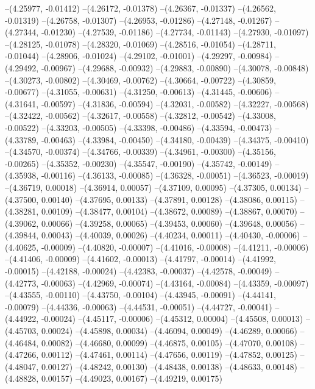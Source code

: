 --(4.25977, -0.01412)
--(4.26172, -0.01378)
--(4.26367, -0.01337)
--(4.26562, -0.01319)
--(4.26758, -0.01307)
--(4.26953, -0.01286)
--(4.27148, -0.01267)
--(4.27344, -0.01230)
--(4.27539, -0.01186)
--(4.27734, -0.01143)
--(4.27930, -0.01097)
--(4.28125, -0.01078)
--(4.28320, -0.01069)
--(4.28516, -0.01054)
--(4.28711, -0.01044)
--(4.28906, -0.01024)
--(4.29102, -0.01001)
--(4.29297, -0.00984)
--(4.29492, -0.00967)
--(4.29688, -0.00932)
--(4.29883, -0.00890)
--(4.30078, -0.00848)
--(4.30273, -0.00802)
--(4.30469, -0.00762)
--(4.30664, -0.00722)
--(4.30859, -0.00677)
--(4.31055, -0.00631)
--(4.31250, -0.00613)
--(4.31445, -0.00606)
--(4.31641, -0.00597)
--(4.31836, -0.00594)
--(4.32031, -0.00582)
--(4.32227, -0.00568)
--(4.32422, -0.00562)
--(4.32617, -0.00558)
--(4.32812, -0.00542)
--(4.33008, -0.00522)
--(4.33203, -0.00505)
--(4.33398, -0.00486)
--(4.33594, -0.00473)
--(4.33789, -0.00463)
--(4.33984, -0.00450)
--(4.34180, -0.00439)
--(4.34375, -0.00410)
--(4.34570, -0.00374)
--(4.34766, -0.00339)
--(4.34961, -0.00300)
--(4.35156, -0.00265)
--(4.35352, -0.00230)
--(4.35547, -0.00190)
--(4.35742, -0.00149)
--(4.35938, -0.00116)
--(4.36133, -0.00085)
--(4.36328, -0.00051)
--(4.36523, -0.00019)
--(4.36719, 0.00018)
--(4.36914, 0.00057)
--(4.37109, 0.00095)
--(4.37305, 0.00134)
--(4.37500, 0.00140)
--(4.37695, 0.00133)
--(4.37891, 0.00128)
--(4.38086, 0.00115)
--(4.38281, 0.00109)
--(4.38477, 0.00104)
--(4.38672, 0.00089)
--(4.38867, 0.00070)
--(4.39062, 0.00066)
--(4.39258, 0.00065)
--(4.39453, 0.00060)
--(4.39648, 0.00056)
--(4.39844, 0.00043)
--(4.40039, 0.00026)
--(4.40234, 0.00011)
--(4.40430, -0.00006)
--(4.40625, -0.00009)
--(4.40820, -0.00007)
--(4.41016, -0.00008)
--(4.41211, -0.00006)
--(4.41406, -0.00009)
--(4.41602, -0.00013)
--(4.41797, -0.00014)
--(4.41992, -0.00015)
--(4.42188, -0.00024)
--(4.42383, -0.00037)
--(4.42578, -0.00049)
--(4.42773, -0.00063)
--(4.42969, -0.00074)
--(4.43164, -0.00084)
--(4.43359, -0.00097)
--(4.43555, -0.00110)
--(4.43750, -0.00104)
--(4.43945, -0.00091)
--(4.44141, -0.00079)
--(4.44336, -0.00063)
--(4.44531, -0.00051)
--(4.44727, -0.00041)
--(4.44922, -0.00024)
--(4.45117, -0.00006)
--(4.45312, 0.00004)
--(4.45508, 0.00013)
--(4.45703, 0.00024)
--(4.45898, 0.00034)
--(4.46094, 0.00049)
--(4.46289, 0.00066)
--(4.46484, 0.00082)
--(4.46680, 0.00099)
--(4.46875, 0.00105)
--(4.47070, 0.00108)
--(4.47266, 0.00112)
--(4.47461, 0.00114)
--(4.47656, 0.00119)
--(4.47852, 0.00125)
--(4.48047, 0.00127)
--(4.48242, 0.00130)
--(4.48438, 0.00138)
--(4.48633, 0.00148)
--(4.48828, 0.00157)
--(4.49023, 0.00167)
--(4.49219, 0.00175)
